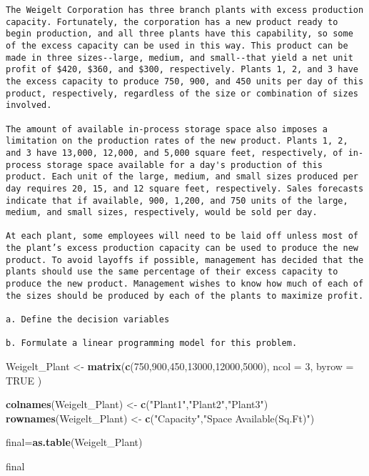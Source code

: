 \documentclass[
]{article}
\newenvironment{Shaded}{\begin{snugshade}}{\end{snugshade}}
\newcommand{\AttributeTok}[1]{\textcolor[rgb]{0.13,0.29,0.53}{#1}}
\newcommand{\ConstantTok}[1]{\textcolor[rgb]{0.56,0.35,0.01}{#1}}
\newcommand{\DecValTok}[1]{\textcolor[rgb]{0.00,0.00,0.81}{#1}}
\newcommand{\FunctionTok}[1]{\textcolor[rgb]{0.13,0.29,0.53}{\textbf{#1}}}
\newcommand{\NormalTok}[1]{#1}
\newcommand{\OtherTok}[1]{\textcolor[rgb]{0.56,0.35,0.01}{#1}}
\newcommand{\StringTok}[1]{\textcolor[rgb]{0.31,0.60,0.02}{#1}}
\begin{document}
\begin{verbatim}
The Weigelt Corporation has three branch plants with excess production capacity. Fortunately, the corporation has a new product ready to begin production, and all three plants have this capability, so some of the excess capacity can be used in this way. This product can be made in three sizes--large, medium, and small--that yield a net unit profit of $420, $360, and $300, respectively. Plants 1, 2, and 3 have the excess capacity to produce 750, 900, and 450 units per day of this product, respectively, regardless of the size or combination of sizes involved.

The amount of available in-process storage space also imposes a limitation on the production rates of the new product. Plants 1, 2, and 3 have 13,000, 12,000, and 5,000 square feet, respectively, of in-process storage space available for a day's production of this product. Each unit of the large, medium, and small sizes produced per day requires 20, 15, and 12 square feet, respectively. Sales forecasts indicate that if available, 900, 1,200, and 750 units of the large, medium, and small sizes, respectively, would be sold per day.

At each plant, some employees will need to be laid off unless most of the plant’s excess production capacity can be used to produce the new product. To avoid layoffs if possible, management has decided that the plants should use the same percentage of their excess capacity to produce the new product. Management wishes to know how much of each of the sizes should be produced by each of the plants to maximize profit.

a. Define the decision variables

b. Formulate a linear programming model for this problem. 
\end{verbatim}

\begin{Shaded}
\begin{Highlighting}[]
\NormalTok{Weigelt\_Plant }\OtherTok{\textless{}{-}} \FunctionTok{matrix}\NormalTok{(}\FunctionTok{c}\NormalTok{(}\DecValTok{750}\NormalTok{,}\DecValTok{900}\NormalTok{,}\DecValTok{450}\NormalTok{,}\DecValTok{13000}\NormalTok{,}\DecValTok{12000}\NormalTok{,}\DecValTok{5000}\NormalTok{), }\AttributeTok{ncol =} \DecValTok{3}\NormalTok{, }\AttributeTok{byrow =} \ConstantTok{TRUE}\NormalTok{ )}

\FunctionTok{colnames}\NormalTok{(Weigelt\_Plant) }\OtherTok{\textless{}{-}} \FunctionTok{c}\NormalTok{(}\StringTok{"Plant1"}\NormalTok{,}\StringTok{"Plant2"}\NormalTok{,}\StringTok{"Plant3"}\NormalTok{)}
\FunctionTok{rownames}\NormalTok{(Weigelt\_Plant) }\OtherTok{\textless{}{-}} \FunctionTok{c}\NormalTok{(}\StringTok{"Capacity"}\NormalTok{,}\StringTok{"Space Available(Sq.Ft)"}\NormalTok{)}

\NormalTok{final}\OtherTok{=}\FunctionTok{as.table}\NormalTok{(Weigelt\_Plant)}

\NormalTok{final}
\end{Highlighting}
\end{Shaded}
\end{document}
